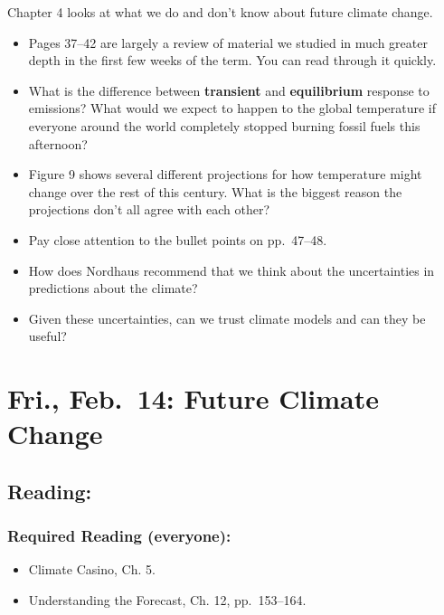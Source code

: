 \documentclass[
]{article}
\providecommand{\tightlist}{%
  \setlength{\itemsep}{0pt}\setlength{\parskip}{0pt}}
\newcommand{\COO}{\ce{CO2}}
\begin{document}
Chapter 4 looks at what we do and don't know about future climate
change.

\begin{itemize}
\tightlist
\item
  Pages 37--42 are largely a review of material we studied in much
  greater depth in the first few weeks of the term. You can read through
  it quickly.
\item
  What is the difference between \textbf{transient} and
  \textbf{equilibrium} response to \COO{} emissions? What would we
  expect to happen to the global temperature if everyone around the
  world completely stopped burning fossil fuels this afternoon?
\item
  Figure 9 shows several different projections for how temperature might
  change over the rest of this century. What is the biggest reason the
  projections don't all agree with each other?
\item
  Pay close attention to the bullet points on pp.~47--48.
\item
  How does Nordhaus recommend that we think about the uncertainties in
  predictions about the climate?
\item
  Given these uncertainties, can we trust climate models and can they be
  useful?
\end{itemize}

\hypertarget{fri.-feb.-14-future-climate-change}{%
\section{Fri., Feb.~14: Future Climate
Change}\label{fri.-feb.-14-future-climate-change}}

\hypertarget{reading-16}{%
\subsection{Reading:}\label{reading-16}}

\hypertarget{required-reading-everyone-13}{%
\subsubsection{Required Reading
(everyone):}\label{required-reading-everyone-13}}

\begin{itemize}
\tightlist
\item
  Climate Casino, Ch. 5.
\item
  Understanding the Forecast, Ch. 12, pp.~153--164.
\end{itemize}
\end{document}
